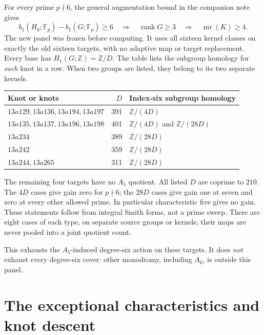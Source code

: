 \documentclass[11pt]{article}
\newcommand{\mr}{\operatorname{mr}}
\newcommand{\Z}{\mathbb Z}
\newcommand{\F}{\mathbb F}
\begin{document}
For every prime $p\nmid6$, the general augmentation bound in the
companion note gives
\[
 b_1(H_6;\F_p)-b_1(G;\F_p)\ge6
 \quad\Longrightarrow\quad \operatorname{rank}G\ge3
 \quad\Longrightarrow\quad \mr(K)\ge4.
\]
The new panel was frozen before computing. It uses all sixteen
kernel classes on exactly the old sixteen targets, with no adaptive
map or target replacement. Every base has $H_1(G;\Z)=\Z/D$.
The table lists the subgroup homology for \emph{each} knot in a row.
When two groups are listed, they belong to its two separate kernels.
\begin{center}
\begin{tabular}{lrl}
\toprule
Knot or knots & $D$ & Index-six subgroup homology\\
\midrule
$13a129,13a136,13a194,13a197$&391&$\Z/(4D)$\\
$13a135,13a137,13a196,13a198$&401&$\Z/(4D)$ and $\Z/(28D)$\\
$13a234$&389&$\Z/(28D)$\\
$13a242$&359&$\Z/(28D)$\\
$13a244,13a265$&311&$\Z/(28D)$\\
\bottomrule
\end{tabular}
\end{center}
The remaining four targets have no $A_5$ quotient. All listed $D$
are coprime to $210$. The $4D$ cases give gain zero for $p\nmid6$;
the $28D$ cases give gain one at seven and zero at every other
allowed prime. In particular characteristic five gives no gain.
These statements follow from integral Smith forms, not a prime sweep.
There are eight cases of each type, on separate source groups or
kernels; their maps are never pooled into a joint quotient count.

This exhausts the $A_5$-induced degree-six action on these targets.
It does \emph{not} exhaust every degree-six cover: other monodromy,
including $A_6$, is outside this panel.

\section{The exceptional characteristics and knot descent}
\end{document}
